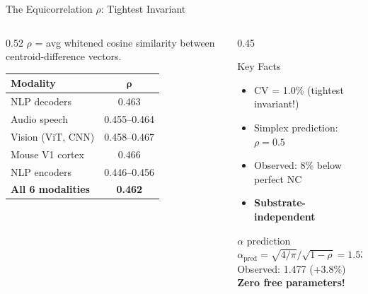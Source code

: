 \documentclass[aspectratio=169,14pt]{beamer}
\begin{document}
\begin{frame}{The Equicorrelation $\rho$: Tightest Invariant}
\begin{columns}[T]
\begin{column}{0.52\textwidth}
$\rho$ = avg whitened cosine similarity between centroid-difference vectors.

\vspace{0.3cm}
\begin{tabular}{lc}
\toprule
\textbf{Modality} & $\boldsymbol{\rho}$ \\
\midrule
NLP decoders & 0.463 \\
Audio speech & 0.455--0.464 \\
Vision (ViT, CNN) & 0.458--0.467 \\
Mouse V1 cortex & 0.466 \\
NLP encoders & 0.446--0.456 \\
\midrule
\textbf{All 6 modalities} & \textbf{0.462} \\
\bottomrule
\end{tabular}
\end{column}
\begin{column}{0.45\textwidth}
\begin{exampleblock}{Key Facts}
\begin{itemize}
\item CV = 1.0\% (tightest invariant!)
\item Simplex prediction: $\rho = 0.5$
\item Observed: 8\% below perfect NC
\item \textbf{Substrate-independent}
\end{itemize}
\end{exampleblock}

\vspace{0.2cm}
\begin{block}{$\alpha$ prediction}
$\alpha_\mathrm{pred} = \sqrt{4/\pi}/\sqrt{1-\rho} = 1.534$\\
Observed: 1.477 (+3.8\%)\\
\textbf{Zero free parameters!}
\end{block}
\end{column}
\end{columns}
\end{frame}
\end{document}
